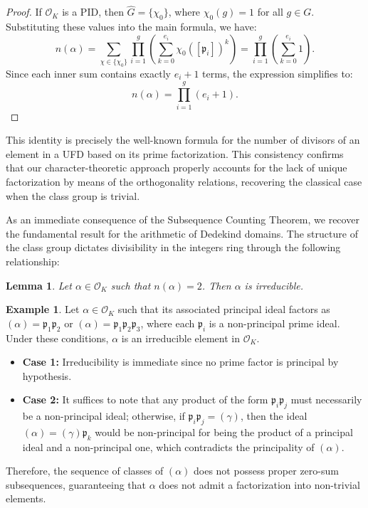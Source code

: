 \documentclass[11pt]{article}
\newtheorem{lemma}{Lemma}
\theoremstyle{definition}
\newtheorem{example}{Example}
\begin{document}
\begin{proof}
If $\mathcal{O}_K$ is a PID, then $\hat{G}=\{\chi_0\}$, where $\chi_0(g) = 1$ for all $g \in G$. Substituting these values into the main formula, we have:
\begin{equation*}
    n(\alpha) =  \sum_{\chi \in \{\chi_0\}} \prod_{i=1}^{g} \left( \sum_{k=0}^{e_i} \chi_0([\mathfrak{p}_i])^k \right) = \prod_{i=1}^{g} \left( \sum_{k=0}^{e_i} 1 \right).
\end{equation*}
Since each inner sum contains exactly $e_i + 1$ terms, the expression simplifies to:
\begin{equation*}
    n(\alpha) = \prod_{i=1}^{g} (e_i + 1).
\end{equation*}

\end{proof}

This identity is precisely the well-known formula for the number of divisors of an element in a UFD based on its prime factorization. This consistency confirms that our character-theoretic approach properly accounts for the lack of unique factorization by means of the orthogonality relations, recovering the classical case when the class group is trivial.

As an immediate consequence of the Subsequence Counting Theorem, we recover the fundamental result for the arithmetic of Dedekind domains. The structure of the class group dictates divisibility in the integers ring through the following relationship:


\begin{lemma}
    Let $\alpha\in\mathcal{O}_K$ such that $n(\alpha)=2$. Then $\alpha$ is irreducible. 
\end{lemma}




\begin{example}
Let $\alpha \in \mathcal{O}_K$  such that its associated principal ideal factors as $(\alpha) = \mathfrak{p}_1 \mathfrak{p}_2$ or $(\alpha) = \mathfrak{p}_1 \mathfrak{p}_2 \mathfrak{p}_3$, where each $\mathfrak{p}_i$ is a non-principal prime ideal. Under these conditions, $\alpha$ is an irreducible element in $\mathcal{O}_K$. 

\begin{itemize}
    \item \textbf{Case 1:} Irreducibility is immediate since no prime factor is principal by hypothesis.
    
    \item \textbf{Case 2:} It suffices to note that any product of the form $\mathfrak{p}_i \mathfrak{p}_j$ must necessarily be a non-principal ideal; otherwise, if $\mathfrak{p}_i \mathfrak{p}_j = (\gamma)$, then the ideal $(\alpha) = (\gamma) \mathfrak{p}_k$ would be non-principal for being the product of a principal ideal and a non-principal one, which contradicts the principality of $(\alpha)$. 
\end{itemize}

Therefore, the sequence of classes of $(\alpha)$ does not possess proper zero-sum subsequences, guaranteeing that $\alpha$ does not admit a factorization into non-trivial elements.
\end{example}
\end{document}
